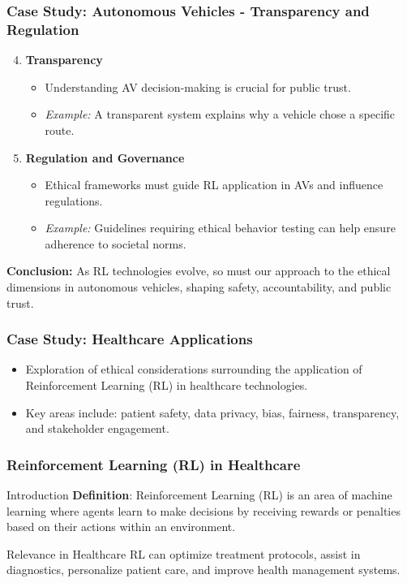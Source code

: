 \documentclass{beamer}
\begin{document}
\begin{frame}[fragile]
    \frametitle{Case Study: Autonomous Vehicles - Transparency and Regulation}
    \begin{enumerate}
        \setcounter{enumi}{3}
        \item \textbf{Transparency}
        \begin{itemize}
            \item Understanding AV decision-making is crucial for public trust.
            \item \textit{Example:} A transparent system explains why a vehicle chose a specific route.
        \end{itemize}

        \item \textbf{Regulation and Governance}
        \begin{itemize}
            \item Ethical frameworks must guide RL application in AVs and influence regulations.
            \item \textit{Example:} Guidelines requiring ethical behavior testing can help ensure adherence to societal norms.
        \end{itemize}
    \end{enumerate}

    \textbf{Conclusion:} 
    As RL technologies evolve, so must our approach to the ethical dimensions in autonomous vehicles, shaping safety, accountability, and public trust.
\end{frame}

\begin{frame}[fragile]
    \frametitle{Case Study: Healthcare Applications}
    \begin{itemize}
        \item Exploration of ethical considerations surrounding the application of Reinforcement Learning (RL) in healthcare technologies.
        \item Key areas include: patient safety, data privacy, bias, fairness, transparency, and stakeholder engagement.
    \end{itemize}
\end{frame}

\begin{frame}[fragile]
    \frametitle{Reinforcement Learning (RL) in Healthcare}
    \begin{block}{Introduction}
        \textbf{Definition}: Reinforcement Learning (RL) is an area of machine learning where agents learn to make decisions by receiving rewards or penalties based on their actions within an environment.
    \end{block}
    \begin{block}{Relevance in Healthcare}
        RL can optimize treatment protocols, assist in diagnostics, personalize patient care, and improve health management systems.
    \end{block}
\end{frame}
\end{document}
